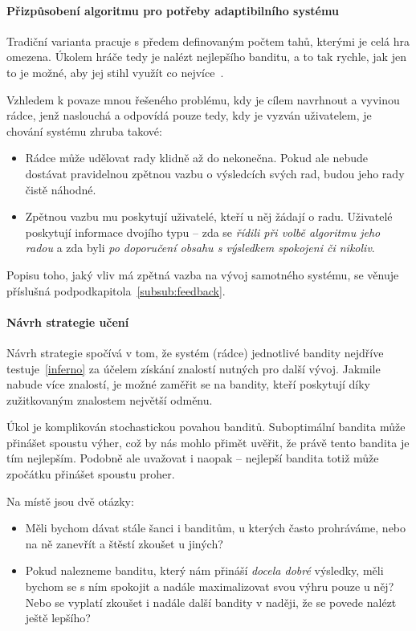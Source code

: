 \documentclass[thesis=M,czech]{FITthesis}[2014/05/07]
\begin{document}
\paragraph{Přizpůsobení algoritmu pro potřeby adaptibilního systému}
Tradiční varianta pracuje s předem definovaným počtem tahů, kterými je celá hra omezena. Úkolem hráče tedy je nalézt nejlepšího banditu, a to tak rychle, jak jen to je možné, aby jej stihl využít co nejvíce~\cite{camdp}.

Vzhledem k povaze mnou řešeného problému, kdy je cílem navrhnout a vyvinou rádce, jenž naslouchá a odpovídá pouze tedy, kdy je vyzván uživatelem, je chování systému zhruba takové:

\begin{itemize}
	\item Rádce může udělovat rady klidně až do nekonečna. Pokud ale nebude dostávat pravidelnou zpětnou vazbu o výsledcích svých rad, budou jeho rady čistě náhodné.
	\item Zpětnou vazbu mu poskytují uživatelé, kteří u něj žádají o radu. Uživatelé poskytují informace dvojího typu – zda se \emph{řídili při volbě algoritmu jeho radou} a zda byli \emph{po doporučení obsahu s výsledkem spokojeni či nikoliv}.  
\end{itemize}

Popisu toho, jaký vliv má zpětná vazba na vývoj samotného systému, se věnuje příslušná podpodkapitola~\ref{subsub:feedback}.

\paragraph{Návrh strategie učení}
	
Návrh strategie spočívá v tom, že systém (rádce) jednotlivé bandity nejdříve testuje~\ref{inferno} za účelem získání znalostí nutných pro další vývoj. Jakmile nabude více znalostí, je možné zaměřit se na bandity, kteří poskytují díky zužitkovaným znalostem největší odměnu. 

Úkol je komplikován stochastickou povahou banditů. Suboptimální bandita může přinášet spoustu výher, což by nás mohlo přimět uvěřit, že právě tento bandita je tím nejlepším. Podobně ale uvažovat i naopak – nejlepší bandita totiž může zpočátku přinášet spoustu proher.

Na místě jsou dvě otázky:

\begin{itemize}
	\item Měli bychom dávat stále šanci i banditům, u kterých často prohráváme, nebo na ně zanevřít a štěstí zkoušet u jiných?
	\item Pokud nalezneme banditu, který nám přináší \emph{docela dobré} výsledky, měli bychom se s ním spokojit a nadále maximalizovat svou výhru pouze u něj? Nebo se vyplatí zkoušet i nadále další bandity v naději, že se povede nalézt ještě lepšího?
\end{itemize}
\end{document}

